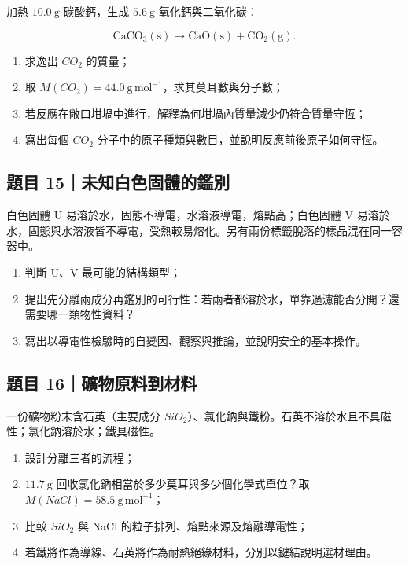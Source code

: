\documentclass[11pt,a4paper]{article}
\providecommand{\tightlist}{%
  \setlength{\itemsep}{0pt}\setlength{\parskip}{0pt}}
\begin{document}
加熱 \(10.0\ \mathrm g\) 碳酸鈣，生成 \(5.6\ \mathrm g\) 氧化鈣與二氧化碳：

\[
\mathrm{CaCO_3(s)\longrightarrow CaO(s)+CO_2(g)}.
\]

\begin{enumerate}
\def\labelenumi{\arabic{enumi}.}
\tightlist
\item
  求逸出 \(CO_2\) 的質量；
\item
  取 \(M(CO_2)=44.0\ \mathrm{g\,mol^{-1}}\)，求其莫耳數與分子數；
\item
  若反應在敞口坩堝中進行，解釋為何坩堝內質量減少仍符合質量守恆；
\item
  寫出每個 \(CO_2\) 分子中的原子種類與數目，並說明反應前後原子如何守恆。
\end{enumerate}

\subsection{題目 15｜未知白色固體的鑑別}\label{ux984cux76ee-15ux672aux77e5ux767dux8272ux56faux9ad4ux7684ux9451ux5225}

白色固體 U 易溶於水，固態不導電，水溶液導電，熔點高；白色固體 V 易溶於水，固態與水溶液皆不導電，受熱較易熔化。另有兩份標籤脫落的樣品混在同一容器中。

\begin{enumerate}
\def\labelenumi{\arabic{enumi}.}
\tightlist
\item
  判斷 U、V 最可能的結構類型；
\item
  提出先分離兩成分再鑑別的可行性：若兩者都溶於水，單靠過濾能否分開？還需要哪一類物性資料？
\item
  寫出以導電性檢驗時的自變因、觀察與推論，並說明安全的基本操作。
\end{enumerate}

\subsection{題目 16｜礦物原料到材料}\label{ux984cux76ee-16ux7926ux7269ux539fux6599ux5230ux6750ux6599}

一份礦物粉末含石英（主要成分 \(SiO_2\)）、氯化鈉與鐵粉。石英不溶於水且不具磁性；氯化鈉溶於水；鐵具磁性。

\begin{enumerate}
\def\labelenumi{\arabic{enumi}.}
\tightlist
\item
  設計分離三者的流程；
\item
  \(11.7\ \mathrm g\) 回收氯化鈉相當於多少莫耳與多少個化學式單位？取 \(M(NaCl)=58.5\ \mathrm{g\,mol^{-1}}\)；
\item
  比較 \(SiO_2\) 與 NaCl 的粒子排列、熔點來源及熔融導電性；
\item
  若鐵將作為導線、石英將作為耐熱絕緣材料，分別以鍵結說明選材理由。
\end{enumerate}
\end{document}
